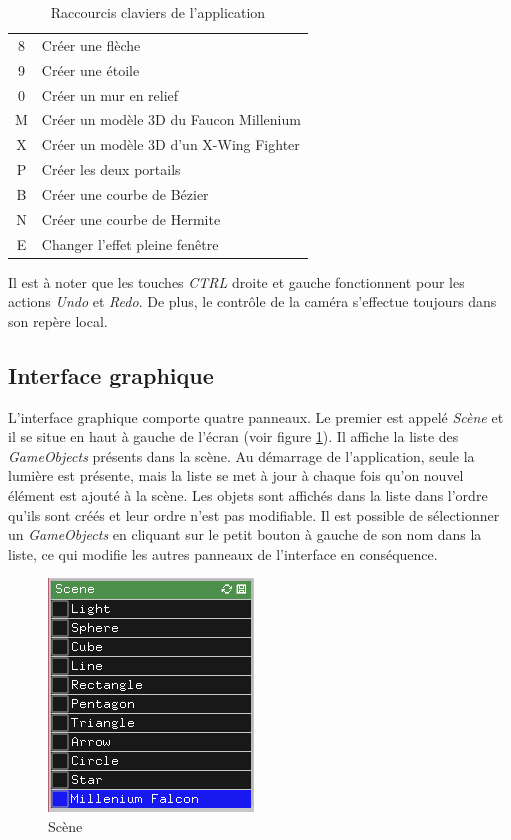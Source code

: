 \begin{table}[h]
\begin{center}
\begin{tabular}{|c|l|}
        8 & Créer une flèche\\
        9 & Créer une étoile\\
        0 & Créer un mur en relief\\
        M & Créer un modèle 3D du Faucon Millenium\\
        X & Créer un modèle 3D d'un X-Wing Fighter\\
        P & Créer les deux portails\\
        B & Créer une courbe de Bézier\\
        N & Créer une courbe de Hermite\\
        E & Changer l'effet pleine fenêtre \\
        \hline
    \end{tabular}
    \caption{Raccourcis claviers de l'application}
    \end{center}
\end{table}
Il est à noter que les touches \emph{CTRL} droite et gauche fonctionnent pour les actions \emph{Undo} et \emph{Redo}.
De plus, le contrôle de la caméra s'effectue toujours dans son repère local.\\

\subsection{Interface graphique}
L'interface graphique comporte quatre panneaux.
Le premier est appelé \emph{Scène} et il se situe en haut à gauche de l'écran (voir figure \ref{fig:scene}).
Il affiche la liste des \emph{GameObjects} présents dans la scène.
Au démarrage de l'application, seule la lumière est présente, mais la liste se met à jour à chaque fois qu'on nouvel élément est ajouté à la scène.
Les objets sont affichés dans la liste dans l'ordre qu'ils sont créés et leur ordre n'est pas modifiable.
Il est possible de sélectionner un \emph{GameObjects} en cliquant sur le petit bouton à gauche de son nom dans la liste, ce qui modifie les autres panneaux de l'interface en conséquence.\\

\begin{figure}[H]
    \centering
	\includegraphics[scale=0.7]{fig/scene.png}
	\caption{Scène}
	\label{fig:scene}
\end{figure}

